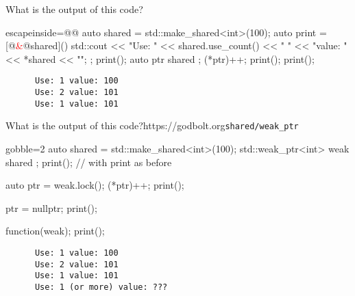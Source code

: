 \begin{frame}[fragile]
  \begin{exampleblock}{What is the output of this code?}
    \small
    \begin{cppcode*}{escapeinside=@@}
auto shared = std::make_shared<int>(100);
auto print = [@\textcolor{red}{&}@shared](){
  std::cout << "Use: " << shared.use_count() << " "
            << "value: " << *shared << "\n";
};
print();
{
  auto ptr{ shared };
  (*ptr)++;
  print();
}
print();
      \end{cppcode*}
  \end{exampleblock}
  \begin{block}{}
    \small
    \begin{verbatim}
      Use: 1 value: 100
      Use: 2 value: 101
      Use: 1 value: 101
    \end{verbatim}
  \end{block}
\end{frame}

\begin{advanced}

\begin{frame}[fragile]
  \begin{exampleblockGB}{What is the output of this code?}{https://godbolt.org}{\texttt{shared/weak\_ptr}}
    \small
    \begin{cppcode*}{gobble=2}
      auto shared = std::make_shared<int>(100);
      std::weak_ptr<int> weak{ shared };
      print(); // with print as before

      auto ptr = weak.lock();
      (*ptr)++;       print();

      ptr = nullptr;  print();

      function(weak); print();
    \end{cppcode*}
  \end{exampleblockGB}
  \pause
  \begin{block}{}
    \small
    \begin{verbatim}
      Use: 1 value: 100
      Use: 2 value: 101
      Use: 1 value: 101
      Use: 1 (or more) value: ???
    \end{verbatim}
  \end{block}
\end{frame}

\end{advanced}

